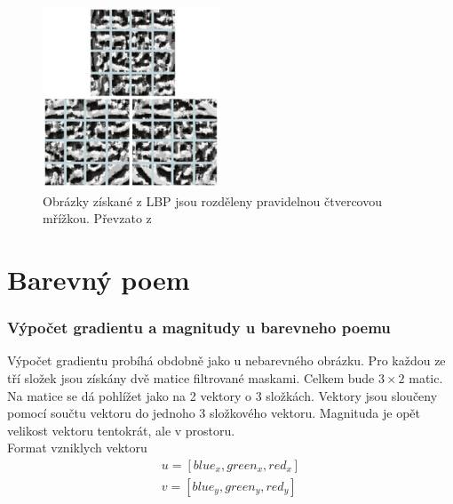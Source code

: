 \documentclass{report}
\begin{document}
\begin{figure}[H]
	\centering
	\includegraphics[width=150pt]{./img/vypocet_histogramu.png}
	\caption{Obrázky získané z LBP jsou rozděleny pravidelnou čtvercovou mřížkou. Převzato z \cite{SrovnaniDeskriptoru}}
\end{figure} 
\chapter{Barevný poem}

\subsection{Výpočet gradientu a magnitudy u barevneho poemu}
Výpočet gradientu probíhá obdobně jako u nebarevného obrázku. Pro každou ze tří složek jsou získány dvě matice filtrované maskami. Celkem bude $3 \times 2$ matic. Na matice se dá pohlížet jako na 2 vektory o 3 složkách. Vektory jsou sloučeny pomocí součtu vektoru do jednoho 3 složkového vektoru. Magnituda je opět velikost vektoru tentokrát, ale v prostoru. \\

Format vzniklych vektoru
\begin{align} 
	\label{bgr_vektory} 
		    u = [ blue_x, green_x, red_x ] \\ 
		    v = [ blue_y, green_y, red_y ] 
\end{align}
\end{document}

